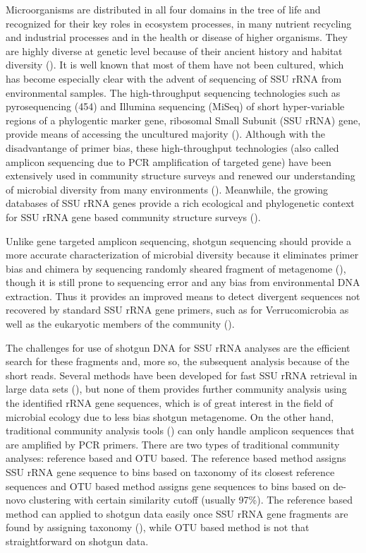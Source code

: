 \documentclass[12pt]{article}
\begin{document}
Microorganisms are distributed in all four domains in the tree of life
and recognized for their key roles in ecosystem processes, in many
nutrient recycling and industrial processes and in the health or
disease of higher organisms. They are highly diverse at genetic level
because of their ancient history and habitat diversity
(\cite{ward2002}). It is well known that most of them have not been
cultured, which has become especially clear with the advent of
sequencing of SSU rRNA from environmental samples. The high-throughput
sequencing technologies such as pyrosequencing (454) and Illumina
sequencing (MiSeq) of short hyper-variable regions of a phylogentic
marker gene, ribosomal Small Subunit (SSU rRNA) gene, provide means of
accessing the uncultured majority (\cite{streit2004}). Although with
the disadvantange of primer bias, these high-throughput technologies
(also called amplicon sequencing due to PCR amplification of targeted
gene) have been extensively used in community structure surveys and
renewed our understanding of microbial diversity from many
environments (\cite{huse2008,caporaso2012miseq}). Meanwhile, the
growing databases of SSU rRNA genes provide a rich ecological and
phylogenetic context for SSU rRNA gene based community structure
surveys (\cite{rdp2009,silva2013}).

Unlike gene targeted amplicon sequencing, shotgun sequencing should
provide a more accurate characterization of microbial diversity
because it eliminates primer bias and chimera by sequencing randomly
sheared fragment of metagenome (\cite{chimeraslayer}), though it is
still prone to sequencing error and any bias from environmental DNA
extraction. Thus it provides an improved means to detect divergent
sequences not recovered by standard SSU rRNA gene primers, such as for
Verrucomicrobia as well as the eukaryotic members of the community
(\cite{baker2003,primereva2008,verruco2011}).

The challenges for use of shotgun DNA for SSU rRNA analyses are the
efficient search for these fragments and, more so, the subsequent
analysis because of the short reads. Several methods have been
developed for fast SSU rRNA retrieval in large data sets
(\cite{ribopicker,metarna,rrnaselector,metaxa}), but none of them
provides further community analysis using the identified rRNA gene
sequences, which is of great interest in the field of microbial
ecology due to less bias shotgun metagenome. On the other hand,
traditional community analysis tools (\cite{rdp2009,mothur,qiime}) can
only handle amplicon sequences that are amplified by PCR primers.
There are two types of traditional community analyses: reference based
and OTU based. The reference based method assigns SSU rRNA gene
sequence to bins based on taxonomy of its closest reference sequences
and OTU based method assigns gene sequences to bins based on de-novo
clustering with certain similarity cutoff (usually 97\%). The
reference based method can applied to shotgun data easily once SSU
rRNA gene fragments are found by assigning taxonomy
(\cite{rdpclassifier}), while OTU based method is not that
straightforward on shotgun data.
\end{document}
